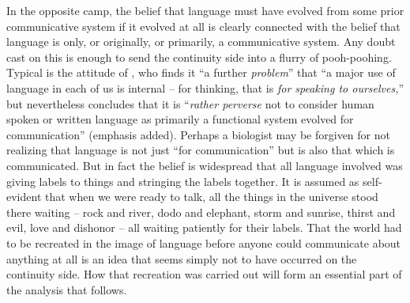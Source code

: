 In the opposite camp, the belief that language must have evolved from some prior communicative system if it evolved at all is clearly connected with the belief that language is only, or originally, or pri\-marily, a communicative system. Any doubt cast on this is enough to send the continuity side into a flurry of pooh-poohing. Typical is the attitude of \citet[175]{Young1978}, who finds it ``a further \textit{problem}'' that ``a major use of language in each of us is internal -- for thinking, that is \textit{for speaking to ourselves,}'' but nevertheless concludes that it is ``\textit{rather perverse} not to consider human spoken or written language as primarily a functional system evolved for communication'' (emphasis added). Perhaps a biologist may be forgiven for not realizing that language is not just ``for communication'' but is also that which is communicated. But in fact the belief is widespread that all language in\-volved was giving labels to things and stringing the labels together. It is assumed as self-evident that when we were ready to talk, all the things in the universe stood there waiting -- rock and river, dodo and elephant, storm and sunrise, thirst and evil, love and dishonor -- all waiting patiently for their labels. That the world had to be recreated in the image of language before anyone could communicate about anything at all is an idea that seems simply not to have occurred on the continuity side. How that recreation was carried out will form an essential part of the analysis that follows.

